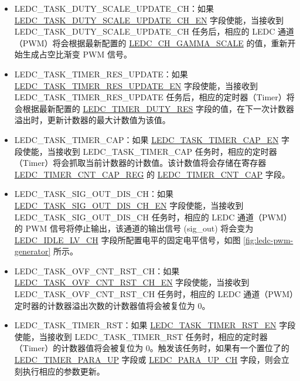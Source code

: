 \documentclass[main\_\_CN.tex]{subfiles}
\begin{document}
\begin{itemize}
\item LEDC\_TASK\_DUTY\_SCALE\_UPDATE\_CH：如果 \hyperref[fielddesc:LEDCTASKDUTYSCALEUPDATECHNEN]{LEDC\_TASK\_DUTY\_SCALE\_UPDATE\_CH\_EN} 字段使能，当接收到 LEDC\_TASK\_DUTY\_SCALE\_UPDATE\_CH 任务后，相应的 LEDC 通道（PWM）将会根据最新配置的 \hyperref[fielddesc:LEDCCHNGAMMASCALE]{LEDC\_CH\_GAMMA\_SCALE} 的值，重新开始生成占空比渐变 PWM 信号。
\item LEDC\_TASK\_TIMER\_RES\_UPDATE：如果 \hyperref[fielddesc:LEDCTASKTIMERXRESUPDATEEN]{LEDC\_TASK\_TIMER\_RES\_UPDATE\_EN} 字段使能，当接收到 LEDC\_TASK\_TIMER\_RES\_UPDATE 任务后，相应的定时器（Timer）将会根据最新配置的 \hyperref[fielddesc:LEDCTIMERXDUTYRES]{LEDC\_TIMER\_DUTY\_RES} 字段的值，在下一次计数器溢出时，更新计数器的最大计数值为该值。
\item LEDC\_TASK\_TIMER\_CAP：如果 \hyperref[fielddesc:LEDCTASKTIMERXCAPEN]{LEDC\_TASK\_TIMER\_CAP\_EN} 字段使能，当接收到 LEDC\_TASK\_TIMER\_CAP 任务时，相应的定时器（Timer）将会抓取当前计数器的计数值。该计数值将会存储在寄存器 \hyperref[regdesc:LEDCTIMERXCNTCAPREG]{LEDC\_TIMER\_CNT\_CAP\_REG} 的 \hyperref[fielddesc:LEDCTIMERXCNTCAP]{LEDC\_TIMER\_CNT\_CAP} 字段。
\item LEDC\_TASK\_SIG\_OUT\_DIS\_CH：如果 \hyperref[fielddesc:LEDCTASKSIGOUTDISCHNEN]{LEDC\_TASK\_SIG\_OUT\_DIS\_CH\_EN} 字段使能，当接收到 LEDC\_TASK\_SIG\_OUT\_DIS\_CH 任务时，相应的 LEDC 通道（PWM）的 PWM 信号将停止输出，该通道的输出信号 (sig\_out) 将会变为 \hyperref[fielddesc:LEDCIDLELVCHN]{LEDC\_IDLE\_LV\_CH} 字段所配置电平的固定电平信号，如图 \ref{fig:ledc-pwm-generator} 所示。
\item LEDC\_TASK\_OVF\_CNT\_RST\_CH：如果 \hyperref[fielddesc:LEDCTASKOVFCNTRSTCHNEN]{LEDC\_TASK\_OVF\_CNT\_RST\_CH\_EN} 字段使能，当接收到 LEDC\_TASK\_OVF\_CNT\_RST\_CH 任务时，相应的 LEDC 通道（PWM）定时器的计数器溢出次数的计数器值将会被复位为 0。
\item LEDC\_TASK\_TIMER\_RST：如果 \hyperref[fielddesc:LEDCTASKTIMERXRSTEN]{LEDC\_TASK\_TIMER\_RST\_EN} 字段使能，当接收到 LEDC\_TASK\_TIMER\_RST 任务时，相应的定时器（Timer）的计数器值将会被复位为 0。触发该任务时，如果有一个置位了的 \hyperref[fielddesc:LEDCTIMERXPARAUP]{LEDC\_TIMER\_PARA\_UP} 字段或 \hyperref[fielddesc:LEDCPARAUPCHN]{LEDC\_PARA\_UP\_CH} 字段，则会立刻执行相应的参数更新。

\end{itemize}
\end{document}
